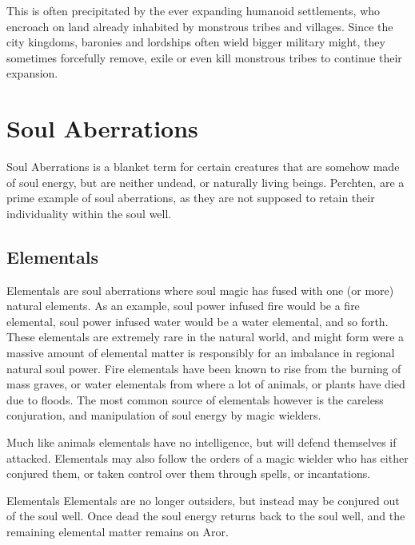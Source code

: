 This is often precipitated by the ever expanding humanoid settlements, who
encroach on land already inhabited by monstrous tribes and villages. Since the
city kingdoms, baronies and lordships often wield bigger military might, they
sometimes forcefully remove, exile or even kill monstrous tribes to continue
their expansion.










\section{Soul Aberrations}
\label{sec:Soul Aberrations}

Soul Aberrations is a blanket term for certain creatures that are somehow made
of soul energy, but are neither undead, or naturally living beings. Perchten,
are a prime example of soul aberrations, as they are not supposed to retain
their individuality within the soul well.

\subsection{Elementals}
\label{sec:Elementals}

Elementals are soul aberrations where soul magic has fused with one (or more)
natural elements. As an example, soul power infused fire would be a fire
elemental, soul power infused water would be a water elemental, and so forth.
These elementals are extremely rare in the natural world, and might form were
a massive amount of elemental matter is responsibly for an imbalance in
regional natural soul power. Fire elementals have been known to rise from the
burning of mass graves, or water elementals from where a lot of animals, or
plants have died due to floods. The most common source of elementals however
is the careless conjuration, and manipulation of soul energy by magic
wielders.

Much like animals elementals have no intelligence, but will defend themselves
if attacked. Elementals may also follow the orders of a magic wielder who
has either conjured them, or taken control over them through spells, or
incantations.

\begin{35e}{Elementals}
  Elementals are no longer outsiders, but instead may be conjured out of the
  soul well. Once dead the soul energy returns back to the soul well, and the
  remaining elemental matter remains on Aror.
\end{35e}

